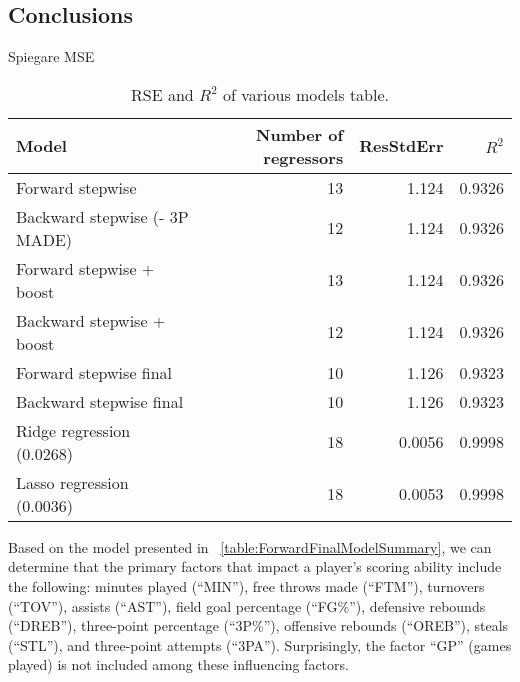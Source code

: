 \subsection{Conclusions}

Spiegare MSE

\begin{table}[H]
	\centering
	\begin{tabular}{|| l | r | r | r ||} 
		\hline
		Model & Number of regressors & ResStdErr & $R^2$ \\
		\hline
		Forward stepwise & 13 & 1.124 & 0.9326 \\
		\hline
		Backward stepwise (- 3P MADE) & 12 & 1.124 & 0.9326 \\
		\hline
		Forward stepwise + boost & 13 & 1.124 & 0.9326 \\
		\hline
		Backward stepwise + boost & 12 & 1.124 & 0.9326 \\
		\hline
		Forward stepwise final & 10 & 1.126 & 0.9323 \\
		\hline
		Backward stepwise final & 10 & 1.126 & 0.9323 \\
		\hline
		Ridge regression (0.0268) & 18 & 0.0056 & 0.9998 \\
		\hline
		Lasso regression (0.0036) & 18 & 0.0053 & 0.9998 \\
		\hline
	\end{tabular}
	\caption{RSE and $R^2$ of various models table.}
	\label{table:RegEvalParams}
\end{table}

Based on the model presented in \Tab~\ref{table:ForwardFinalModelSummary}, we can determine that the primary factors that impact a player's scoring ability include the following: minutes played (``MIN''), free throws made (``FTM''), turnovers (``TOV''), assists (``AST''), field goal percentage (``FG\%''), defensive rebounds (``DREB''), three-point percentage (``3P\%''), offensive rebounds (``OREB''), steals (``STL''), and three-point attempts (``3PA'').
Surprisingly, the factor ``GP'' (games played) is not included among these influencing factors.